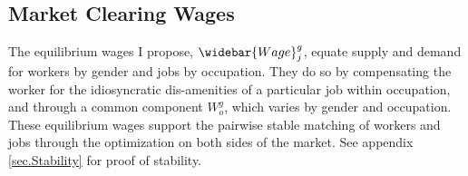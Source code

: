 \documentclass[12pt]{article}
\begin{document}







\subsection{Market Clearing Wages}






The equilibrium wages I propose, $\widebar{Wage}^g_j$, equate supply and demand for workers by gender and jobs by occupation. They do so by compensating the worker for the idiosyncratic dis-amenities of a particular job within occupation, and through a common component $W^g_o$, which varies by gender and occupation. These equilibrium wages support the pairwise stable matching of workers and jobs through the optimization on both sides of the market. See appendix \ref{sec.Stability} for proof of stability.
\end{document}
